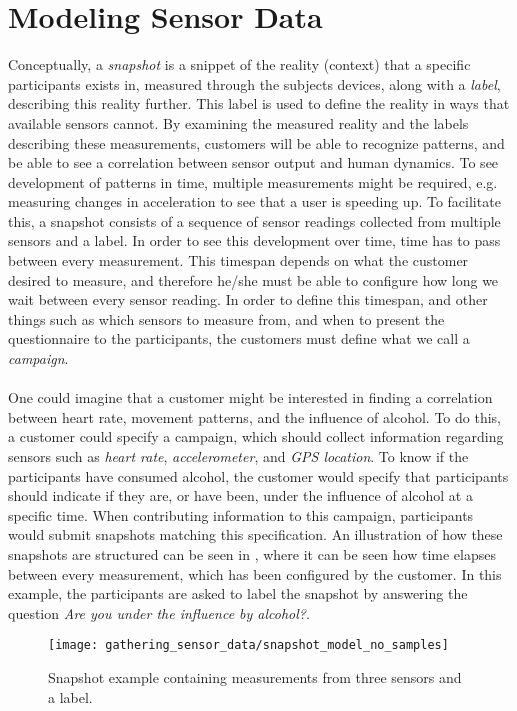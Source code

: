 
\section{Modeling Sensor Data}
\label{sec:modeling_sensor_data}

Conceptually, a \emph{snapshot} is a snippet of the reality (context) that a specific participants exists in, measured through the subjects devices, along with a \emph{label}, describing this reality further. This label is used to define the reality in ways that available sensors cannot. By examining the measured reality and the labels describing these measurements, customers will be able to recognize patterns, and be able to see a correlation between sensor output and human dynamics. To see development of patterns in time, multiple measurements might be required, e.g. measuring changes in acceleration to see that a user is speeding up. To facilitate this, a snapshot consists of a sequence of sensor readings collected from multiple sensors and a label. In order to see this development over time, time has to pass between every measurement. This timespan depends on what the customer desired to measure, and therefore he/she must be able to configure how long we wait between every sensor reading. In order to define this timespan, and other things such as which sensors to measure from, and when to present the questionnaire to the participants, the customers must define what we call a \emph{campaign}.
\\\\
One could imagine that a customer might be interested in finding a correlation between heart rate, movement patterns, and the influence of alcohol. To do this, a customer could specify a campaign, which should collect information regarding sensors such as \emph{heart rate}, \emph{accelerometer}, and \emph{GPS location}. To know if the participants have consumed alcohol, the customer would specify that participants should indicate if they are, or have been, under the influence of alcohol at a specific time. When contributing information to this campaign, participants would submit snapshots matching this specification. An illustration of how these snapshots are structured can be seen in , where it can be seen how time elapses between every measurement, which has been configured by the customer. In this example, the participants are asked to label the snapshot by answering the question \emph{Are you under the influence by alcohol?}.
\\
\begin{figure}[!htbp]
    \centering
    \texttt{[image: gathering\_sensor\_data/snapshot\_model\_no\_samples]}
    \caption{Snapshot example containing measurements from three sensors and a label.}
    \label{fig:snapshot_model_no_samples}
\end{figure}
\FloatBarrier


